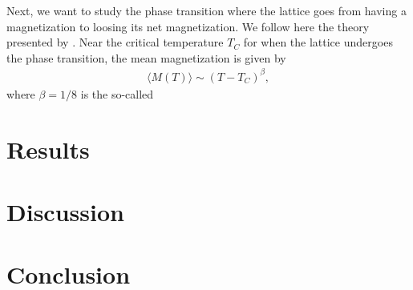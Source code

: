 \documentclass[twocolumn]{aastex62}
\begin{document}
Next, we want to study the phase transition where the lattice goes from having a
magnetization to loosing its net magnetization. We follow here the theory presented
by \cite{jensen:2019}. Near the critical temperature
$T_C$ for when the lattice undergoes the phase transition, the mean magnetization is
given by 
\begin{align}
	\langle M(T) \rangle \sim (T-T_C)^\beta,
\end{align}
where $\beta = 1/8$ is the so-called 

\section{Results} \label{sec:results}

\begin{figure*}
	\texttt{[image: \{Figures/thermo\_quants]}.pdf}
	\caption{}
	\label{fig:thermo_quants}
\end{figure*}

\section{Discussion} \label{sec:discussion}

\section{Conclusion} \label{sec:conclusion}

\nocite{Jensen:2019}



\end{document}
